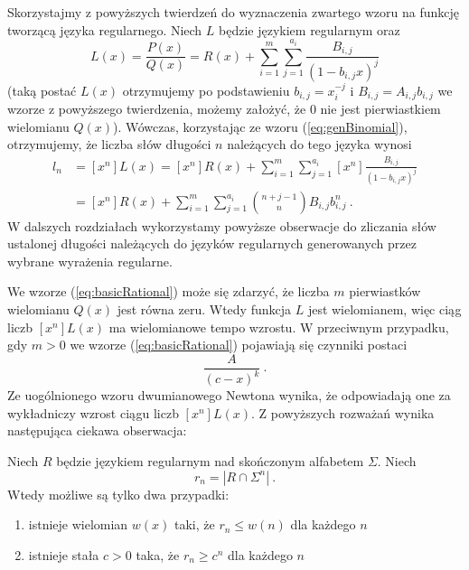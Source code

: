 Skorzystajmy z powyższych twierdzeń do wyznaczenia zwartego wzoru na funkcję tworzącą języka regularnego. Niech $L$ będzie językiem regularnym oraz
$$L(x)=\frac{P(x)}{Q(x)}=R(x)+\sum_{i=1}^{m}{\sum_{j=1}^{a_i}{\frac{B_{i,j}}{(1-b_{i,j}x)^{j}}}}$$
(taką postać $L(x)$ otrzymujemy po podstawieniu $b_{i,j}=x_i^{-j}$ i $B_{i,j}=A_{i,j}b_{i,j}$ we wzorze z powyższego twierdzenia, możemy założyć, że $0$ nie jest pierwiastkiem wielomianu $Q(x)$). Wówczas, korzystając ze wzoru (\ref{eq:genBinomial}), otrzymujemy, że liczba słów długości $n$ należących do tego języka wynosi
\begin{equation} \label{eq:basicRational}
    \begin{aligned}
        l_n&=[x^n]L(x)=[x^n]R(x)+\sum_{i=1}^{m}{\sum_{j=1}^{a_i}{[x^n]\frac{B_{i,j}}{(1-b_{i,j}x)^j}}}\\
        &=[x^n]R(x)+\sum_{i=1}^{m}{\sum_{j=1}^{a_i}{\binom{n+j-1}{n}B_{i,j}b_{i,j}^n}}~.
    \end{aligned}
\end{equation}
W dalszych rozdziałach wykorzystamy powyższe obserwacje do zliczania słów ustalonej długości należących do języków regularnych generowanych przez wybrane wyrażenia regularne.

We wzorze (\ref{eq:basicRational}) może się zdarzyć, że liczba $m$ pierwiastków wielomianu $Q(x)$ jest równa zeru. Wtedy funkcja $L$ jest wielomianem, więc ciąg liczb $[x^n]L(x)$ ma wielomianowe tempo wzrostu. W przeciwnym przypadku, gdy $m>0$ we wzorze  (\ref{eq:basicRational}) pojawiają się czynniki postaci 
$$\frac{A}{(c- x)^k}~.$$
Ze uogólnionego wzoru dwumianowego Newtona wynika, że odpowiadają one za wykładniczy wzrost ciągu liczb $[x^n]L(x)$. 
Z powyższych rozważań wynika następująca ciekawa obserwacja:
\begin{theorem}
Niech  $R$ będzie językiem regularnym nad skończonym alfabetem $\Sigma$. Niech
$$
r_n = |R\cap\Sigma^n|~. 
$$
Wtedy możliwe są tylko dwa przypadki:
\begin{enumerate}
    \item istnieje wielomian $w(x)$ taki, że $r_n \leq w(n)$ dla każdego $n$ 
    \item istnieje stała $c>0$ taka, że $r_n \geq c^n$ dla każdego $n$
\end{enumerate}
\end{theorem}